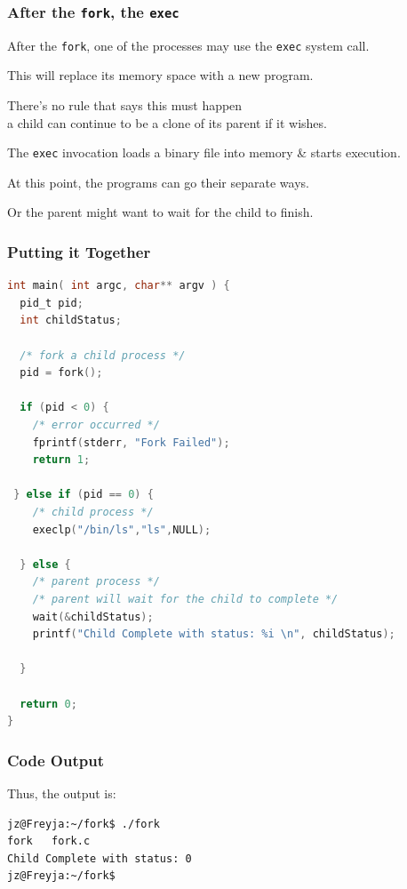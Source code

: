 \begin{frame}
\frametitle{After the \texttt{fork}, the \texttt{exec}}


After the \texttt{fork}, one of the processes may use the \texttt{exec} system call.

This will replace its memory space with a new program. 

There's no rule that says this must happen\\
\quad a child can continue to be a clone of its parent if it wishes.

The \texttt{exec} invocation loads a binary file into memory \& starts execution. 

At this point, the programs can go their separate ways.

Or the parent might want to wait for the child to finish.


\end{frame}

\begin{frame}[fragile]
\frametitle{Putting it Together}

{\scriptsize
\begin{lstlisting}[language=C]
int main( int argc, char** argv ) {
  pid_t pid;
  int childStatus;

  /* fork a child process */
  pid = fork();
  
  if (pid < 0) { 
    /* error occurred */ 
    fprintf(stderr, "Fork Failed"); 
    return 1;
  
 } else if (pid == 0) {    
    /* child process */
    execlp("/bin/ls","ls",NULL);
    
  } else {    
    /* parent process */
    /* parent will wait for the child to complete */
    wait(&childStatus);
    printf("Child Complete with status: %i \n", childStatus);
    
  }
    
  return 0;
}
\end{lstlisting}
}

\end{frame}

\begin{frame}[fragile]
\frametitle{Code Output}

Thus, the output is:
\begin{verbatim}
jz@Freyja:~/fork$ ./fork 
fork   fork.c
Child Complete with status: 0
jz@Freyja:~/fork$ 
\end{verbatim}


\end{frame}

